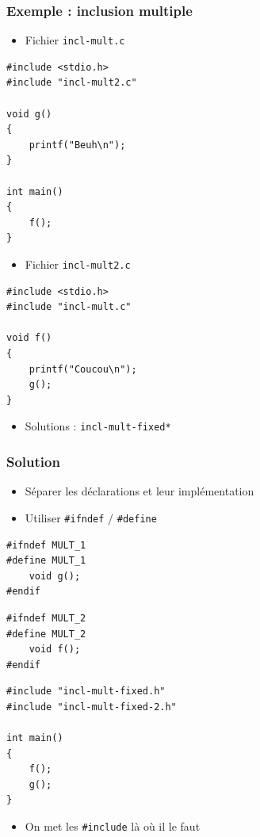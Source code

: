 \begin{frame}[containsverbatim]
\frametitle{Exemple : inclusion multiple}
\begin{itemize}
\item Fichier \texttt{incl-mult.c}
\end{itemize}
\begin{lstlisting}
#include <stdio.h>
#include "incl-mult2.c"

void g()
{
	printf("Beuh\n");
}

int main()
{
	f();
}
\end{lstlisting}
\begin{itemize}
\item Fichier \texttt{incl-mult2.c}
\end{itemize}
\begin{lstlisting}
#include <stdio.h>
#include "incl-mult.c"

void f()
{
	printf("Coucou\n");
	g();
}

\end{lstlisting}
\begin{itemize}
\item Solutions : \texttt{incl-mult-fixed*}
\end{itemize}
\end{frame}

\begin{frame}[containsverbatim]
\frametitle{Solution}
\begin{itemize}
\item Séparer les déclarations et leur implémentation
\item Utiliser \lstinline|#ifndef| / \lstinline|#define|
\end{itemize}
\begin{lstlisting}
#ifndef MULT_1
#define MULT_1
	void g();
#endif
\end{lstlisting}
\begin{lstlisting}
#ifndef MULT_2
#define MULT_2
	void f();
#endif
\end{lstlisting}
\begin{lstlisting}
#include "incl-mult-fixed.h"
#include "incl-mult-fixed-2.h"

int main()
{
	f();
	g();
}
\end{lstlisting}
\begin{itemize}
\item On met les \lstinline|#include| là où il le faut
\end{itemize}
\end{frame}

